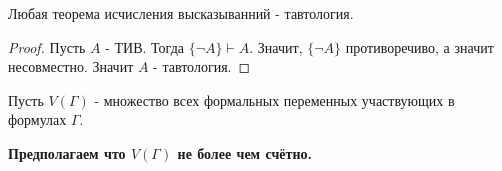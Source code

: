 \begin{consequence} \thmslashn

    Любая теорема исчисления высказыванний - тавтология.
    \begin{proof} \thmslashn
    
        Пусть $A$ - ТИВ. Тогда $\{\neg A\} \vdash A $. Значит, $\{\neg A\}$ противоречиво, а значит несовместно. Значит $A$ - тавтология.
    \end{proof}
\end{consequence}

\begin{definition} \thmslashn 

    Пусть $V(\Gamma)$ - множество всех формальных переменных участвующих в формулах $\Gamma$.

    {\color{red}\bf Предполагаем что $V(\Gamma)$ не более чем счётно.}
\end{definition}

